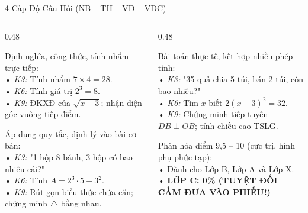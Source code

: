 \documentclass[aspectratio=169,11pt]{beamer}
\begin{document}
\begin{frame}{4 Cấp Độ Câu Hỏi (NB – TH – VD – VDC)}
  \begin{columns}[T]
    \begin{column}{0.48\textwidth}
      \begin{tcolorbox}[slidecard, top=2pt, bottom=2pt, title=\textbf{NB (Nhận biết — 1 bước)}]
        \scriptsize
        Định nghĩa, công thức, tính nhẩm trực tiếp:\\
        • \textit{K3:} Tính nhẩm $7 \times 4 = 28$.\\
        • \textit{K6:} Tính giá trị $2^3 = 8$.\\
        • \textit{K9:} ĐKXĐ của $\sqrt{x-3}$; nhận diện góc vuông tiếp điểm.
      \end{tcolorbox}
      \vspace{1pt}
      \begin{tcolorbox}[successcard, top=2pt, bottom=2pt, title=\textbf{TH (Thông hiểu — 1–2 bước)}]
        \scriptsize
        Áp dụng quy tắc, định lý vào bài cơ bản:\\
        • \textit{K3:} "1 hộp 8 bánh, 3 hộp có bao nhiêu cái?"\\
        • \textit{K6:} Tính $A = 2^3 \cdot 5 - 3^2$.\\
        • \textit{K9:} Rút gọn biểu thức chứa căn; chứng minh $\triangle$ bằng nhau.
      \end{tcolorbox}
    \end{column}

    \begin{column}{0.48\textwidth}
      \begin{tcolorbox}[accentcard, top=2pt, bottom=2pt, title=\textbf{VD (Vận dụng — 2–3 bước)}]
        \scriptsize
        Bài toán thực tế, kết hợp nhiều phép tính:\\
        • \textit{K3:} "35 quả chia 5 túi, bán 2 túi, còn bao nhiêu?"\\
        • \textit{K6:} Tìm $x$ biết $2(x-3)^2 = 32$.\\
        • \textit{K9:} Chứng minh tiếp tuyến $DB \perp OB$; tính chiều cao TSLG.
      \end{tcolorbox}
      \vspace{1pt}
      \begin{tcolorbox}[dangercard, top=2pt, bottom=2pt, title=\textbf{VDC (Vận dụng cao — $\ge 4$ bước)}]
        \scriptsize
        Phân hóa điểm 9,5 – 10 (cực trị, hình phụ phức tạp):\\
        • Dành cho Lớp B, Lớp A và Lớp X.\\
        • \textbf{\color{danger}LỚP C: 0\% (TUYỆT ĐỐI CẤM ĐƯA VÀO PHIẾU!)}
      \end{tcolorbox}
    \end{column}
  \end{columns}
\end{frame}
\end{document}
